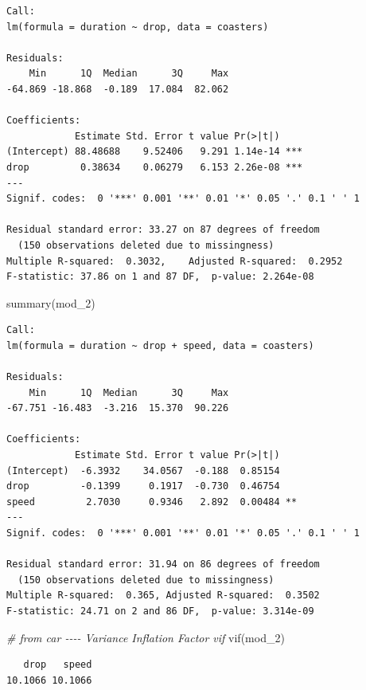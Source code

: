 \documentclass[
]{article}
\newenvironment{Shaded}{\begin{snugshade}}{\end{snugshade}}
\newcommand{\CommentTok}[1]{\textcolor[rgb]{0.56,0.35,0.01}{\textit{#1}}}
\newcommand{\FunctionTok}[1]{\textcolor[rgb]{0.00,0.00,0.00}{#1}}
\newcommand{\NormalTok}[1]{#1}
\begin{document}
\begin{verbatim}
Call:
lm(formula = duration ~ drop, data = coasters)

Residuals:
    Min      1Q  Median      3Q     Max 
-64.869 -18.868  -0.189  17.084  82.062 

Coefficients:
            Estimate Std. Error t value Pr(>|t|)    
(Intercept) 88.48688    9.52406   9.291 1.14e-14 ***
drop         0.38634    0.06279   6.153 2.26e-08 ***
---
Signif. codes:  0 '***' 0.001 '**' 0.01 '*' 0.05 '.' 0.1 ' ' 1

Residual standard error: 33.27 on 87 degrees of freedom
  (150 observations deleted due to missingness)
Multiple R-squared:  0.3032,    Adjusted R-squared:  0.2952 
F-statistic: 37.86 on 1 and 87 DF,  p-value: 2.264e-08
\end{verbatim}

\begin{Shaded}
\begin{Highlighting}[]
\FunctionTok{summary}\NormalTok{(mod\_2)}
\end{Highlighting}
\end{Shaded}

\begin{verbatim}
Call:
lm(formula = duration ~ drop + speed, data = coasters)

Residuals:
    Min      1Q  Median      3Q     Max 
-67.751 -16.483  -3.216  15.370  90.226 

Coefficients:
            Estimate Std. Error t value Pr(>|t|)   
(Intercept)  -6.3932    34.0567  -0.188  0.85154   
drop         -0.1399     0.1917  -0.730  0.46754   
speed         2.7030     0.9346   2.892  0.00484 **
---
Signif. codes:  0 '***' 0.001 '**' 0.01 '*' 0.05 '.' 0.1 ' ' 1

Residual standard error: 31.94 on 86 degrees of freedom
  (150 observations deleted due to missingness)
Multiple R-squared:  0.365, Adjusted R-squared:  0.3502 
F-statistic: 24.71 on 2 and 86 DF,  p-value: 3.314e-09
\end{verbatim}

\begin{Shaded}
\begin{Highlighting}[]
\CommentTok{\# from car {-}{-}{-}{-} Variance Inflation Factor vif}
\FunctionTok{vif}\NormalTok{(mod\_2)}
\end{Highlighting}
\end{Shaded}

\begin{verbatim}
   drop   speed 
10.1066 10.1066 
\end{verbatim}
\end{document}
